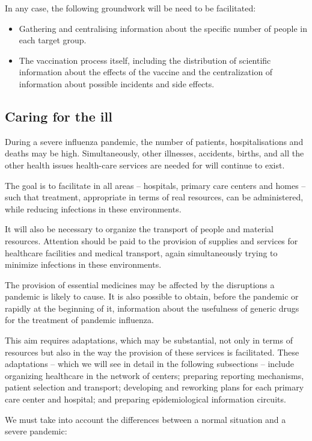 \documentclass[12pt, a4]{scrartcl}
\begin{document}
In any case, the following groundwork will be need to be facilitated:
\begin{itemize}
	\item Gathering and centralising information about the specific number of people in each target group.
	\item The vaccination process itself, including the distribution of scientific information about the effects of the vaccine and the centralization of information about possible incidents and side effects.
\end{itemize}

\subsection{Caring for the ill}
During a severe influenza pandemic, the number of patients, hospitalisations and deaths may be high. Simultaneously, other illnesses, accidents, births, and all the other health issues health-care services are needed for will continue to exist.

The goal is to facilitate in all areas – hospitals, primary care centers and homes – such that treatment, appropriate in terms of real resources, can be administered, while reducing infections in these environments.

It will also be necessary to organize the transport of people and material resources. Attention should be paid to the provision of supplies and services for healthcare facilities and medical transport, again simultaneously trying to minimize infections in these environments.

The provision of essential medicines may be affected by the disruptions a pandemic is likely to cause. It is also possible to obtain, before the pandemic or rapidly at the beginning of it, information about the usefulness of generic drugs for the treatment of pandemic influenza.

This aim requires adaptations, which may be substantial, not only in terms of resources but also in the way the provision of these services is facilitated. These adaptations – which we will see in detail in the following subsections – include organizing healthcare in the network of centers; preparing reporting mechanisms, patient selection and transport; developing and reworking plans for each primary care center and hospital; and preparing epidemiological information circuits.

We must take into account the differences between a normal situation and a severe pandemic:
\end{document}
